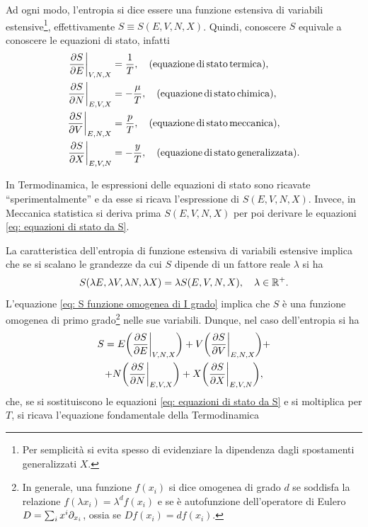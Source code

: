 Ad ogni modo, l'entropia si dice essere una funzione estensiva di variabili estensive\footnote{Per semplicità si evita spesso di evidenziare la dipendenza dagli spostamenti generalizzati $X$.}, effettivamente $S \equiv S(E,V,N,X)$. Quindi, conoscere $S$ equivale a conoscere le equazioni di stato, infatti
\begin{align}
\label{eq: equazioni di stato da S}
    \frac{\partial S}{\partial E}\bigg|_{V,N,X}&=\frac{1}{T},\quad\mathrm{(equazione\,di\,stato\,termica)}, \\
    \frac{\partial S}{\partial N}\bigg|_{E,V,X}&=-\frac{\mu}{T},\quad\mathrm{(equazione\,di\,stato\,chimica)}, \\
    \frac{\partial S}{\partial V}\bigg|_{E,N,X}&=\frac{p}{T},\quad\mathrm{(equazione\,di\,stato\,meccanica)}, \\
    \frac{\partial S}{\partial X}\bigg|_{E,V,N}&=-\frac{y}{T},\quad\mathrm{(equazione\,di\,stato\,generalizzata)}.
\end{align}
\begin{obs}
    In Termodinamica, le espressioni delle equazioni di stato sono ricavate ``sperimentalmente'' e da esse si ricava l'espressione di $S(E,V,N,X)$. Invece, in Meccanica statistica si deriva prima $S(E,V,N,X)$ per poi derivare le equazioni \eqref{eq: equazioni di stato da S}. 
\end{obs}
La caratteristica dell'entropia di funzione estensiva di variabili estensive implica che se si scalano le grandezze da cui $S$ dipende di un fattore reale $\lambda$ si ha
\begin{equation}
\label{eq: S funzione omogenea di I grado}
    S(\lambda E,\lambda V,\lambda N,\lambda X) = \lambda S(E,V,N,X),\quad \lambda\in\mathbb{R}^+.
\end{equation}
L'equazione \eqref{eq: S funzione omogenea di I grado} implica che $S$ è una funzione omogenea di primo grado\footnote{In generale, una funzione $f(x_i)$ si dice omogenea di grado $d$ se soddisfa la relazione $f(\lambda x_i) = \lambda^d f(x_i)$ e se è autofunzione dell'operatore di Eulero $D=\sum\nolimits_ix^i\partial_{x_i}$, ossia se $Df(x_i)=df(x_i)$.} nelle sue variabili. Dunque, nel caso dell'entropia si ha
\begin{multline}
    S = E\bigg(\frac{\partial S}{\partial E}\bigg|_{V,N,X}\bigg) + V\bigg(\frac{\partial S}{\partial V}\bigg|_{E,N,X}\bigg) + \\
    + N\bigg(\frac{\partial S}{\partial N}\bigg|_{E,V,X}\bigg) + X\bigg(\frac{\partial S}{\partial X}\bigg|_{E,V,N}\bigg),
\end{multline}
che, se si sostituiscono le equazioni \eqref{eq: equazioni di stato da S} e si moltiplica per $T$, si ricava l'equazione fondamentale della Termodinamica
